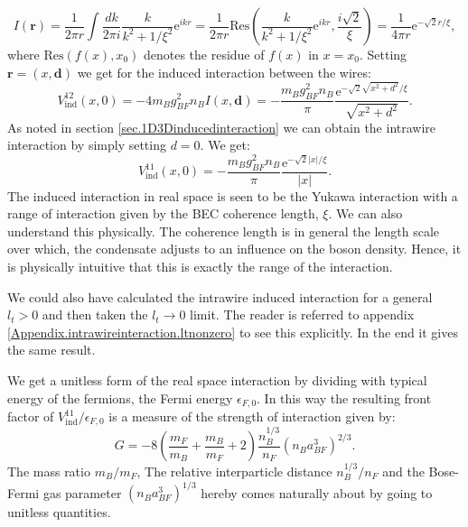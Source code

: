 \begin{equation}
I(\mathbf{r}) = \frac{1}{2\pi r}\int \frac{dk}{2\pi i} \frac{k}{k^2 + 1/\xi^2}\text{e}^{ikr} = \frac{1}{2\pi r}\text{Res}\left(\frac{k}{k^2 + 1/\xi^2}\text{e}^{ikr}, \frac{i\sqrt{2}}{\xi}\right) = \frac{1}{4\pi r} \text{e}^{-\sqrt{2}r/\xi}, \nonumber
\end{equation}
where $\text{Res}(f(x), x_0)$ denotes the residue of $f(x)$ in $x = x_0$. Setting $\mathbf{r} = (x, \mathbf{d})$ we get for the induced interaction between the wires:
\begin{equation}
V^{12}_{\text{ind}}(x, 0) = -4m_Bg^2_{BF}n_B I(x, \mathbf{d}) = -\frac{m_Bg_{BF}^2n_B}{\pi}\frac{\text{e}^{ -\sqrt{2}\sqrt{x^2 + d^2}/\xi }}{\sqrt{x^2 + d^2}}.
\label{eq.V12indx}
\end{equation}
As noted in section \ref{sec.1D3Dinducedinteraction} we can obtain the intrawire interaction by simply setting $d = 0$. We get:
\begin{equation}
V^{11}_{\text{ind}}(x, 0) = -\frac{m_Bg_{BF}^2n_B}{\pi}\frac{\text{e}^{ -\sqrt{2}|x|/\xi }}{|x|}.
\label{eq.V11indx}
\end{equation}
The induced interaction in real space is seen to be the Yukawa interaction with a range of interaction given by the BEC coherence length, $\xi$. We can also understand this physically. The coherence length is in general the length scale over which, the condensate adjusts to an influence on the boson density. Hence, it is physically intuitive that this is exactly the range of the interaction. 

We could also have calculated the intrawire induced interaction for a general $l_t > 0$ and then taken the $l_t \to 0$ limit. The reader is referred to appendix \ref{Appendix.intrawireinteraction.ltnonzero} to see this explicitly. In the end it gives the same result. 

We get a unitless form of the real space interaction by dividing with typical energy of the fermions, the Fermi energy $\epsilon_{F,0}$. In this way the resulting front factor of $V^{11}_{\text{ind}} / \epsilon_{F,0}$ is a measure of the strength of interaction given by:
\begin{equation}
G = - 8\left( \frac{m_F}{m_B} + \frac{m_B}{m_F} + 2 \right) \frac{n_B^{1/3}}{n_F}(n_Ba_{BF}^3)^{2/3}.
\label{eq.interactionstrength.wires}
\end{equation}
The mass ratio $m_B / m_F$, The relative interparticle distance $n_B^{1/3} / n_F$ and the Bose-Fermi gas parameter $(n_Ba_{BF}^3)^{1/3}$ hereby comes naturally about by going to unitless quantities. 

